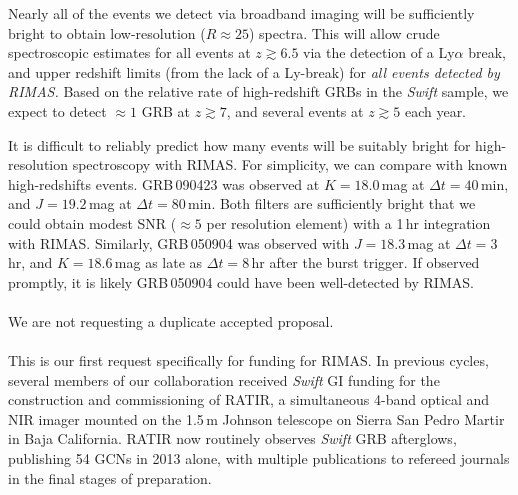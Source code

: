 \documentclass[letterpaper,11pt]{article}
\begin{document}
Nearly all of the events we detect via broadband imaging will be sufficiently 
bright to obtain low-resolution ($R \approx 25$) spectra.  This will allow crude
spectroscopic estimates for all events at $z \gtrsim 6.5$ via the detection of a
Ly$\alpha$ break, and upper redshift limits (from the lack of a Ly-break)
for \textit{all events detected by RIMAS.}  Based on the relative rate of 
high-redshift GRBs in the \textit{Swift} sample\cite{pcb+09,gkk+11}, we expect 
to detect $\approx 1$ GRB at $z \gtrsim 7$, and several events at $z \gtrsim 5$ 
each year. 

It is difficult to reliably predict how many events will be suitably bright 
for high-resolution spectroscopy with RIMAS.  For simplicity, we can compare with known
high-redshifts events.  GRB\,090423\cite{tfl+09} was observed at $K = 18.0$\,mag at
$\Delta t = 40$\,min, and $J = 19.2$\,mag at $\Delta t = 80$\,min.  Both filters are 
sufficiently bright that we could obtain modest SNR ($\approx 5$ per resolution
element) with a 1\,hr integration with RIMAS.  Similarly, GRB\,050904\cite{hnr+05}
was observed with $J = 18.3$\,mag at $\Delta t = 3$\,hr, and $K = 18.6$\,mag as
late as $\Delta t = 8$\,hr after the burst trigger.  If observed promptly, it is likely
GRB\,050904 could have been well-detected by RIMAS.\\


\smallskip\\
We are not requesting a duplicate accepted proposal.\\

\smallskip\\
This is our first request specifically for funding for RIMAS.  In previous cycles,
several members of our collaboration received \textit{Swift} GI funding for the 
construction and commissioning of RATIR, a simultaneous 4-band optical and NIR
imager mounted on the 1.5\,m Johnson telescope on Sierra San Pedro Martir in Baja 
California.  RATIR now routinely observes \textit{Swift} GRB afterglows, publishing
54 GCNs in 2013 alone, with multiple publications to refereed journals in the final
stages of preparation. \\
\end{document}
